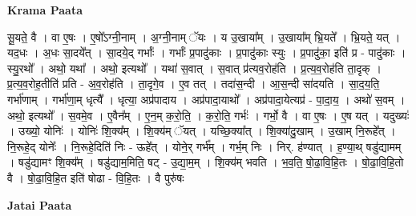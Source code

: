 \documentclass[17pt]{extarticle}
\begin{document}
\textbf{Krama Paata} \newline

सू॒यते॒ वै । वा ए॒षः । ए॒षो᳚ऽग्नी॒नाम् । अ॒ग्नी॒नाम् ॅयः । य उ॒खाया᳚म् । उ॒खाया᳚म् भ्रि॒यते᳚ । भ्रि॒यते॒ यत् । यद॒धः । अ॒धः सा॒दये᳚त् । सा॒दये॒द् गर्भाः᳚ । गर्भाः᳚ प्र॒पादु॑काः । प्र॒पादु॑काः स्युः । प्र॒पादु॑का॒ इति॑ प्र - पादु॑काः । स्यु॒रथो᳚ । अथो॒ यथा᳚ । अथो॒ इत्यथो᳚ । यथा॑ स॒वात् । स॒वात् प्र॑त्यव॒रोह॑ति । प्र॒त्य॒व॒रोह॑ति ता॒दृक् । प्र॒त्य॒व॒रोह॒तीति॑ प्रति - अ॒व॒रोह॑ति । ता॒दृगे॒व । ए॒व तत् । तदा॑स॒न्दी । आ॒स॒न्दी सा॑दयति । सा॒द॒य॒ति॒ गर्भा॑णाम् । गर्भा॑णा॒म् धृत्यै᳚ । धृत्या॒ अप्र॑पादाय । अप्र॑पादा॒याथो᳚ । अप्र॑पादा॒येत्यप्र॑ - पा॒दा॒य॒ । अथो॑ स॒वम् । अथो॒ इत्यथो᳚ । स॒वमे॒व । ए॒वैन᳚म् । ए॒न॒म् क॒रो॒ति॒ । क॒रो॒ति॒ गर्भः॑ । गर्भो॒ वै । वा ए॒षः । ए॒ष यत् । यदुख्यः॑ । उख्यो॒ योनिः॑ । योनिः॑ शि॒क्य᳚म् । शि॒क्य॑म् ॅयत् । यच्छि॒क्या᳚त् । शि॒क्या॑दु॒खाम् । उ॒खाम् नि॒रूहे᳚त् । नि॒रूहे॒द् योनेः᳚ । नि॒रूहे॒दिति॑ निः - ऊहे᳚त् । योने॒र् गर्भ᳚म् । गर्भ॒म् निः । निर्. ह॑ण्यात् । ह॒ण्या॒थ् षडु॑द्यामम् । षडु॑द्यामꣳ शि॒क्य᳚म् । षडु॑द्याम॒मिति॒ षट् - उ॒द्या॒म॒म् । शि॒क्य॑म् भवति । भ॒व॒ति॒ षो॒ढा॒वि॒हि॒तः । षो॒ढा॒वि॒हि॒तो वै । षो॒ढा॒वि॒हि॒त इति॑ षोढा - वि॒हि॒तः । वै पुरु॑षः \newline

\textbf{Jatai Paata} \newline
\end{document}
